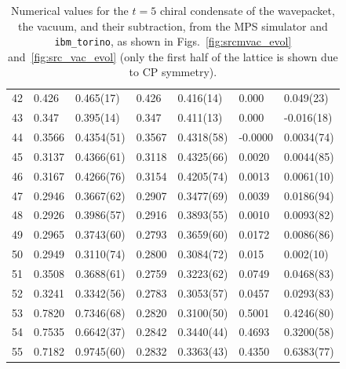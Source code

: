 \documentclass[aps, prc, tightenlines,superscriptaddress, letterpaper, amsmath, amssymb, preprintnumbers, floatfix, longbibliography, nofootinbib]{revtex4-2}
\begin{document}
\begin{table}[!htb]
{\begin{tabularx}{\textwidth}{| c || Y | Y | Y | Y | Y | Y |}
42	&	0.426	&	0.465(17)	&	0.426	&	0.416(14)	&	0.000	&	0.049(23)	\\
43	&	0.347	&	0.395(14)	&	0.347	&	0.411(13)	&	0.000	&	-0.016(18)	\\
44	&	0.3566	&	0.4354(51)	&	0.3567	&	0.4318(58)	&	-0.0000	&	0.0034(74)	\\
45	&	0.3137	&	0.4366(61)	&	0.3118	&	0.4325(66)	&	0.0020	&	0.0044(85)	\\
46	&	0.3167	&	0.4266(76)	&	0.3154	&	0.4205(74)	&	0.0013	&	0.0061(10)	\\
47	&	0.2946	&	0.3667(62)	&	0.2907	&	0.3477(69)	&	0.0039	&	0.0186(94)	\\
48	&	0.2926	&	0.3986(57)	&	0.2916	&	0.3893(55)	&	0.0010	&	0.0093(82)	\\
49	&	0.2965	&	0.3743(60)	&	0.2793	&	0.3659(60)	&	0.0172	&	0.0086(86)	\\
50	&	0.2949	&	0.3110(74)	&	0.2800	&	0.3084(72)	&	0.015	&	0.002(10)	\\
51	&	0.3508	&	0.3688(61)	&	0.2759	&	0.3223(62)	&	0.0749	&	0.0468(83)	\\
52	&	0.3241	&	0.3342(56)	&	0.2783	&	0.3053(57)	&	0.0457	&	0.0293(83)	\\
53	&	0.7820	&	0.7346(68)	&	0.2820	&	0.3100(50)	&	0.5001	&	0.4246(80)	\\
54	&	0.7535	&	0.6642(37)	&	0.2842	&	0.3440(44)	&	0.4693	&	0.3200(58)	\\
55	&	0.7182	&	0.9745(60)	&	0.2832	&	0.3363(43)	&	0.4350	&	0.6383(77)	\\ \hline
\end{tabularx}}
\caption{Numerical values for the $t=5$ chiral condensate of the wavepacket, the vacuum, and their subtraction, from the MPS simulator and {\tt ibm\_torino}, as shown in Figs.~\ref{fig:srcmvac_evol} and~\ref{fig:src_vac_evol} (only the first half of the lattice is shown due to CP symmetry).}
 \label{tab:tablet5}
\end{table}
%
\end{document}
